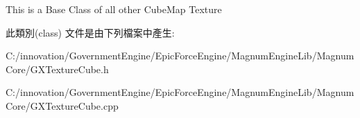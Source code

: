 This is a Base Class of all other Cube\+Map Texture 

此類別(class) 文件是由下列檔案中產生\+:\begin{DoxyCompactItemize}
\item 
C\+:/innovation/\+Government\+Engine/\+Epic\+Force\+Engine/\+Magnum\+Engine\+Lib/\+Magnum\+Core/G\+X\+Texture\+Cube.\+h\item 
C\+:/innovation/\+Government\+Engine/\+Epic\+Force\+Engine/\+Magnum\+Engine\+Lib/\+Magnum\+Core/G\+X\+Texture\+Cube.\+cpp\end{DoxyCompactItemize}
